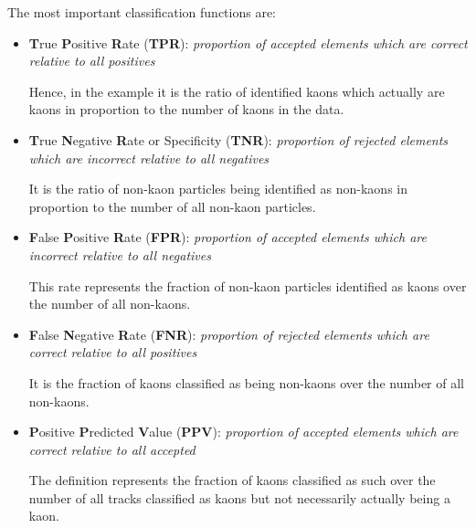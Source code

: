 The most important classification functions are:
\begin{itemize}
	\item
	\begin{samepage}
		\textbf{T}rue \textbf{P}ositive \textbf{R}ate (\textbf{TPR}): \textit{proportion of accepted elements which are correct relative to all positives}

		\nopagebreak
		Hence, in the example it is the ratio of identified kaons which actually are kaons in proportion to the number of kaons in the data.
	\end{samepage}

	\item
	\begin{samepage}
		\textbf{T}rue \textbf{N}egative \textbf{R}ate or Specificity (\textbf{TNR}): \textit{proportion of rejected elements which are incorrect relative to all negatives}

		\nopagebreak
		It is the ratio of non-kaon particles being identified as non-kaons in proportion to the number of all non-kaon particles.
	\end{samepage}

	\item
	\begin{samepage}
		\textbf{F}alse \textbf{P}ositive \textbf{R}ate (\textbf{FPR}): \textit{proportion of accepted elements which are incorrect relative to all negatives}

		\nopagebreak
		This rate represents the fraction of non-kaon particles identified as kaons over the number of all non-kaons.
	\end{samepage}

	\item
	\begin{samepage}
		\textbf{F}alse \textbf{N}egative \textbf{R}ate (\textbf{FNR}): \textit{proportion of rejected elements which are correct relative to all positives}

		\nopagebreak
		It is the fraction of kaons classified as being non-kaons over the number of all non-kaons.
	\end{samepage}

	\item
	\begin{samepage}
		\textbf{P}ositive \textbf{P}redicted \textbf{V}alue (\textbf{PPV}): \textit{proportion of accepted elements which are correct relative to all accepted}

		\nopagebreak
		The definition represents the fraction of kaons classified as such over the number of all tracks classified as kaons but not necessarily actually being a kaon.
	\end{samepage}
\end{itemize}

